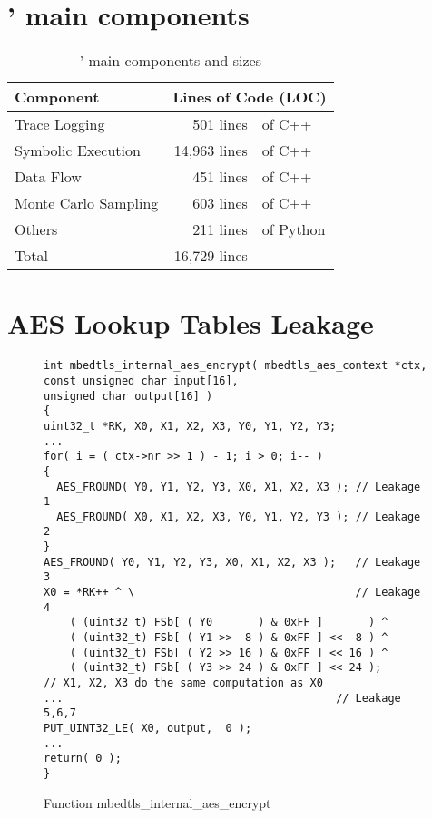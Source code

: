 
\newcommand{\vvv}{\vspace*{-3pt}}

\section{\tool{}' main components}

\label{appendix:code}
\begin{table}[h!]
    \centering
    \caption{\tool{}' main components and sizes}\label{tbl:implementation}
    \begin{tabular}{lr@{~}@{}l}
        \hline
        Component            & \multicolumn{2}{c}{Lines of Code (LOC)}             \\ \hline
        Trace Logging        & 501 lines                               & of C++    \\
        Symbolic Execution   & 14,963 lines                            & of C++    \\
        Data Flow            & 451 lines                               & of C++    \\
        Monte Carlo Sampling & 603 lines                               & of C++    \\
        Others               & 211 lines                               & of Python \\ \hline
        Total                & 16,729 lines                            &           \\\hline
    \end{tabular}
\end{table}

\section{AES Lookup Tables Leakage}
\begin{figure}[h!]
    \centering
    \begin{lstlisting}[xleftmargin=.01\textwidth,xrightmargin=.01\textwidth]
int mbedtls_internal_aes_encrypt( mbedtls_aes_context *ctx,
const unsigned char input[16],
unsigned char output[16] )
{
uint32_t *RK, X0, X1, X2, X3, Y0, Y1, Y2, Y3;
...
for( i = ( ctx->nr >> 1 ) - 1; i > 0; i-- )
{
  AES_FROUND( Y0, Y1, Y2, Y3, X0, X1, X2, X3 ); // Leakage 1
  AES_FROUND( X0, X1, X2, X3, Y0, Y1, Y2, Y3 ); // Leakage 2
}
AES_FROUND( Y0, Y1, Y2, Y3, X0, X1, X2, X3 );   // Leakage 3
X0 = *RK++ ^ \                                  // Leakage 4
    ( (uint32_t) FSb[ ( Y0       ) & 0xFF ]       ) ^
    ( (uint32_t) FSb[ ( Y1 >>  8 ) & 0xFF ] <<  8 ) ^
    ( (uint32_t) FSb[ ( Y2 >> 16 ) & 0xFF ] << 16 ) ^
    ( (uint32_t) FSb[ ( Y3 >> 24 ) & 0xFF ] << 24 );
// X1, X2, X3 do the same computation as X0
...                                          // Leakage 5,6,7
PUT_UINT32_LE( X0, output,  0 );
...
return( 0 );
}
\end{lstlisting}
    \vspace*{-6pt}
    \caption{Function \textsf{mbedtls\_internal\_aes\_encrypt}}
    \label{mbedtls_aes}
    \vspace*{-9pt}
\end{figure}

